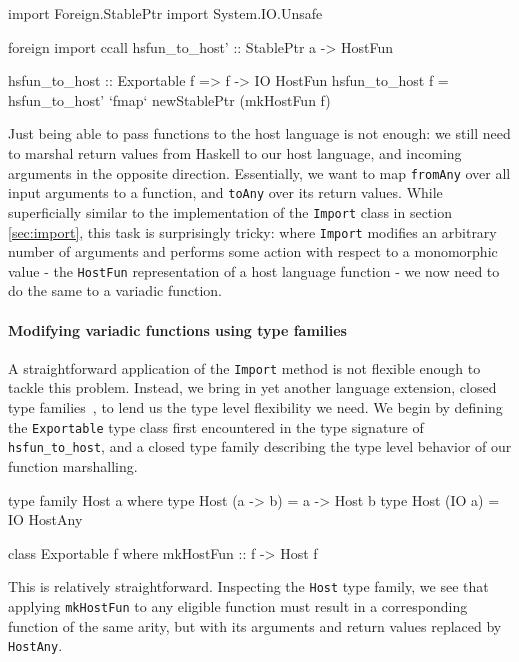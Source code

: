 \documentclass{sigplanconf}
\begin{document}
\begin{code}
  import Foreign.StablePtr
  import System.IO.Unsafe

  foreign import ccall
    hsfun_to_host' :: StablePtr a -> HostFun

  hsfun_to_host :: Exportable f => f -> IO HostFun
  hsfun_to_host f =
    hsfun_to_host' `fmap` newStablePtr (mkHostFun f)
\end{code}

Just being able to pass functions to the host language is not enough: we still
need to marshal return values from Haskell to our host language, and incoming
arguments in the opposite direction. Essentially, we want to map
\lstinline!fromAny! over all input arguments to a function, and
\lstinline!toAny! over its return values.
While superficially similar to the implementation of the \lstinline!Import!
class in section \ref{sec:import}, this task is surprisingly tricky:
where \lstinline!Import! modifies an arbitrary number of arguments and
performs some action with respect to a monomorphic value - the
\lstinline!HostFun! representation of a host language function - we now need
to do the same to a variadic function.

\paragraph{Modifying variadic functions using type families}
A straightforward application of the \lstinline!Import! method is not flexible
enough to tackle this problem. Instead, we bring in yet another language
extension, closed type families\ \cite{closedtypefamilies}, to lend us the type
level flexibility we need. We begin by defining the \lstinline!Exportable!
type class first encountered in the type signature of \lstinline!hsfun_to_host!,
and a closed type family describing the type level behavior of our function
marshalling.

\begin{code}
  type family Host a where
    type Host (a -> b) = a -> Host b
    type Host (IO a)   = IO HostAny

  class Exportable f where
    mkHostFun :: f -> Host f
\end{code}

This is relatively straightforward. Inspecting the \lstinline!Host! type
family, we see that applying \lstinline!mkHostFun! to any eligible function
must result in a corresponding function of the same arity, but with its
arguments and return values replaced by \lstinline!HostAny!.
\end{document}
